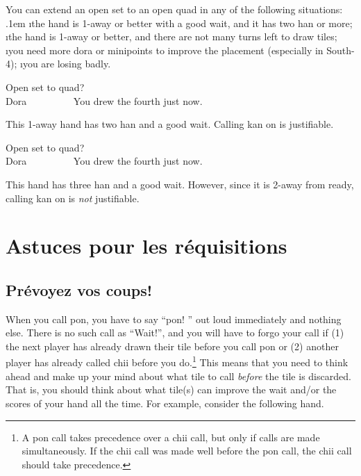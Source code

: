 \bigskip
You can extend an open set to an open quad in any of the following situations:
\bi \itemsep.1em
\i the hand is 1-away or better with a good wait, and it has two {\jap han} or more;
\i the hand is 1-away or better, and there are not many turns left to draw tiles;
\i you need more {\jap dora} or minipoints to improve the placement (especially in South-4);
\i you are losing badly.
\ei

\bigskip
\begin{itembox}[r]{Open set to quad?}
\bp
{}~\zhong\rzhong\zhong~\\
\hfill\footnotesize{{\jap Dora}~~~~~~~~~}
\ep
\vspace{-20pt}You drew the fourth {\LARGE\zhong} just now.
\end{itembox}
\noindent This 1-away hand has two {\jap han} and a good wait. Calling {\jap kan} on {\LARGE\zhong} is justifiable. 

\bigskip
\begin{itembox}[r]{Open set to quad?}
\bp
{}~\zhong\rzhong\zhong~\\
\hfill\footnotesize{{\jap Dora}~~~~~~~~~}
\ep
\vspace{-20pt}You drew the fourth {\LARGE\zhong} just now.
\end{itembox}
\noindent This hand has three {\jap han} and a good wait. However, since it is 2-away from ready, calling {\jap kan} on {\LARGE\zhong} is \emph{not} justifiable. 

\newpage
\section{Astuces pour les réquisitions}

\subsection{Prévoyez vos coups!}

When you call {\jap pon}, you have to say ``{\jap pon}! \textipa{[p\'\textopeno\ng]}'' out loud immediately and nothing else. There is no such call as ``Wait!'',  and you will have to forgo your call if (1) the next player has already drawn their tile before you call {\jap pon} or (2) another player has already called {\jap chii} before you do.\footnote{A {\jap pon} call takes precedence over a {\jap chii} call, but only if calls are made simultaneously. If the {\jap chii} call was made well before the {\jap pon} call, the {\jap chii} call should take precedence.}
This means that you need to think ahead and make up your mind about what tile to call \emph{before} the tile is discarded. That is, you should think about what tile(s) can improve the wait and/or the scores of your hand all the time. For example, consider the following hand. 

